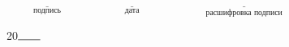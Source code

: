 \noindent
\begin{minipage}{0.25\textwidth}
\begin{singlespace}
\loochRepSV
\end{singlespace}
\end{minipage}\hspace{1cm}
\begin{minipage}{0.75\textwidth}
\begin{singlespace}
\(\underset{\text{подпись}}{\underline{\hspace{3cm}}}\)
\(\underset{\text{дата}}{\underline{\hspace{3cm}}}\)
\(\underset{\text{расшифровка подписи}}{\underline{\hspace{5cm}}}\)
\end{singlespace}
\end{minipage}

\vfill
\begin{center}
\loochRepLocation{} 20\(\rule{0.7cm}{0.5pt}\)
\end{center}


